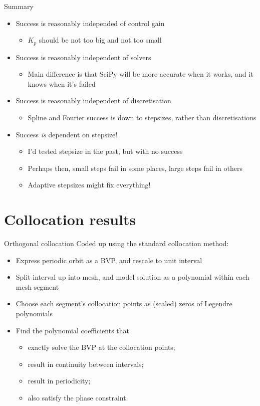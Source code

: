 \documentclass[presentation]{beamer}
\begin{document}
\begin{frame}[label={sec:org2cb5e8c}]{Summary}
\begin{itemize}
\item Success is reasonably independed of control gain
\begin{itemize}
\item \(K_p\) should be not too big and not too small
\end{itemize}
\item Success is reasonably independent of solvers
\begin{itemize}
\item Main difference is that SciPy will be more accurate when it works, and it knows when it's failed
\end{itemize}
\item Success is reasonably independent of discretisation
\begin{itemize}
\item Spline and Fourier success is down to stepsizes, rather than discretisations
\end{itemize}
\item Success \emph{is} dependent on stepsize!
\begin{itemize}
\item I'd tested stepsize in the past, but with no success
\item Perhaps then, small steps fail in some places, large steps fail in others
\item Adaptive stepsizes might fix everything!
\end{itemize}
\end{itemize}
\end{frame}
\section{Collocation results}
\label{sec:org07e4fa1}
\begin{frame}[label={sec:org7850ca3}]{Orthogonal collocation}
Coded up using the standard collocation method:
\begin{itemize}
\item Express periodic orbit as a BVP, and rescale to unit interval
\item Split interval up into mesh, and model solution as a polynomial within each mesh segment
\item Choose each segment's collocation points as (scaled) zeros of Legendre polynomials
\item Find the polynomial coefficients that
\begin{itemize}
\item exactly solve the BVP at the collocation points;
\item result in continuity between intervals;
\item result in periodicity;
\item also satisfy the phase constraint.
\end{itemize}
\end{itemize}
\end{frame}
\end{document}
